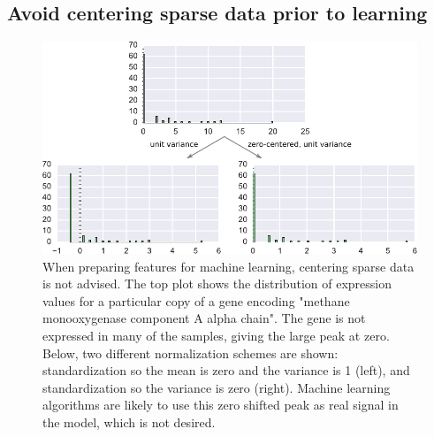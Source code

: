 \subsection{Avoid centering sparse data prior to learning}
\begin{figure}[H]
\centering
    \includegraphics[width=1.0\textwidth]{./tex/chapter3/figures/170324_standard_scalar.pdf}
    \begin{singlespace}
    \caption[Feature scaling: centering sparse features is not advised]{
        When preparing features for machine learning, centering sparse data is not advised.
        The top plot shows the distribution of expression values for a particular copy of a gene encoding
            "methane monooxygenase component A alpha chain".
        The gene is not expressed in many of the samples, giving the large peak at zero.
        Below, two different normalization schemes are shown:
            standardization so the mean is zero and the variance is 1 (left), and
            standardization so the variance is zero (right).
        Machine learning algorithms are likely to use this zero shifted peak as real signal in the model, which is not desired.
        }
    \label{fig:standard_scaler}
    \end{singlespace}
\end{figure}

